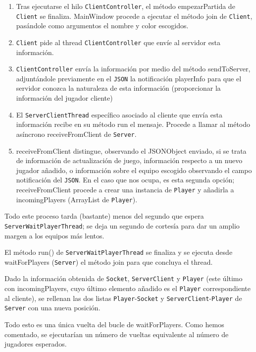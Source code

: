 \documentclass[12pt,a4paper,openright]{book}
\theoremstyle{break}
\begin{document}
\begin{enumerate}
\item Tras ejecutarse el hilo \texttt{ClientController}, el método empezarPartida de \texttt{Client} se finaliza. MainWindow procede a ejecutar el método join de \texttt{Client}, pasándole como argumentos el nombre y color escogidos.
\item \texttt{Client} pide al thread \texttt{ClientController} que envíe al servidor esta información.
\item \texttt{ClientController} envía la información por medio del método sendToServer, adjuntándole previamente en el \texttt{JSON} la notificación playerInfo para que el servidor conozca la naturaleza de esta información (proporcionar la información del jugador cliente)
\item El \texttt{ServerClientThread} específico asociado al cliente que envía esta información recibe en su método run el mensaje. Procede a llamar al método asíncrono receiveFromClient de \texttt{Server}.
\item receiveFromClient distingue, observando el JSONObject enviado, si se trata de información de actualización de juego, información respecto a un nuevo jugador añadido, o información sobre el equipo escogido observando el campo notificación del \texttt{JSON}. En el caso que nos ocupa, es esta segunda opción; receiveFromClient procede a crear una instancia de \texttt{Player} y añadirla a incomingPlayers (ArrayList de \texttt{Player}).
\end{enumerate}

Todo este proceso tarda (bastante) menos del segundo que espera \texttt{ServerWaitPlayerThread}; se deja un segundo de cortesía para dar un amplio margen a los equipos más lentos.

El método run() de \texttt{ServerWaitPlayerThread} se finaliza y se ejecuta desde waitForPlayers (\texttt{Server}) el método join para que concluya el thread.

Dado la información obtenida de \texttt{Socket}, \texttt{ServerClient} y \texttt{Player} (este último con incomingPlayers, cuyo último elemento añadido es el \texttt{Player} correspondiente al cliente), se rellenan las dos listas \texttt{Player}-\texttt{Socket} y \texttt{ServerClient}-\texttt{Player} de \texttt{Server} con una nueva posición.

Todo esto es una única vuelta del bucle de waitForPlayers. Como hemos comentado, se ejecutarían un número de vueltas equivalente al número de jugadores esperados.
\end{document}
